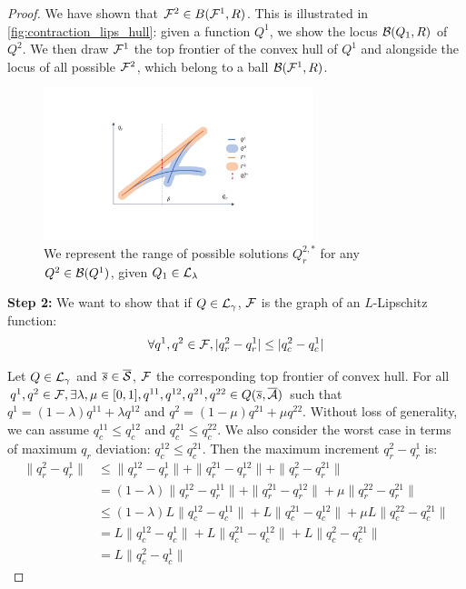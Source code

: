 \begin{proof}

We have shown that $\mathcal{F}^2 \in B(\mathcal{F}^1, R)$.
This is illustrated in \autoref{fig:contraction_lips_hull}: given a function $Q^1$, we show the locus $\mathcal{B}(Q_1,R)$ of $Q^2$. We then draw $\mathcal{F}^1$ the top frontier of the convex hull of $Q^1$ and alongside the locus of all possible $\mathcal{F}^2$, which belong to a ball $\mathcal{B}(\mathcal{F}^1, R)$. 

\begin{figure}[ht]
    \centering
    \includegraphics[trim=7cm 4cm 7cm 4cm, clip, width=0.7\textwidth]{2-Chapters/5-Chapter/img/contraction_lipschitz.pdf}
    \caption{We represent the range of possible solutions $Q_r^{2,*}$ for any $Q^2\in\mathcal{B}(Q^1)$, given $Q_1\in\mathcal{L}_\lambda$}
    \label{fig:contraction_lips_hull}
\end{figure}

\textbf{Step 2:} We want to show that if $Q\in\mathcal{L}_\gamma$, $\mathcal{F}$ is the graph of an $L$-Lipschitz function:
\begin{equation}
\label{eq:L-lip-set}
    \forall q^1,q^2\in\mathcal{F}, |q_r^2-q_r^1| \leq |q_c^2-q_c^1|
\end{equation}

Let $Q\in\mathcal{L}_\gamma$ and $\overline{s}\in\overline{\mathcal{S}}$, $\mathcal{F}$ the corresponding top frontier of convex hull.
For all $q^1,q^2\in\mathcal{F}, \exists \lambda,\mu\in[0,1], q^{11},q^{12},q^{21},q^{22}\in Q(\overline{s},\overline{\mathcal{A}})$ such that $q^1 = (1-\lambda)q^{11} + \lambda q^{12}$ and $q^2 = (1-\mu)q^{21} + \mu q^{22}$.
Without loss of generality, we can assume $q_c^{11}\leq q_c^{12}$ and $q_c^{21}\leq q_c^{22}$. We also consider the worst case in terms of maximum $q_r$ deviation: $q_c^{12} \leq q_c^{21}$.
Then the maximum increment $q_r^2-q_r^{1}$ is:
\begin{align*}
    \|q^2_r-q^{1}_r\| &\leq \|q^{12}_r-q^{1}_r\| + \|q^{21}_r-q^{12}_r\| + \|q^{2}_r-q^{21}_r\| \\
    &= (1-\lambda)\|q^{12}_r-q^{11}_r\| + \|q^{21}_r-q^{12}_r\| + \mu\|q^{22}_r-q^{21}_r\| \\ 
    &\leq (1-\lambda)L\|q^{12}_c-q^{11}_c\| + L\|q^{21}_c-q^{12}_c\| + \mu L\|q^{22}_c-q^{21}_c\| \\
    &= L\|q^{12}_c-q^{1}_c\| + L\|q^{21}_c-q^{12}_c\| + L\|q^{2}_c-q^{21}_c\|\\
    &= L\|q^{2}_c-q^{1}_c\|
\end{align*}


\end{proof}
